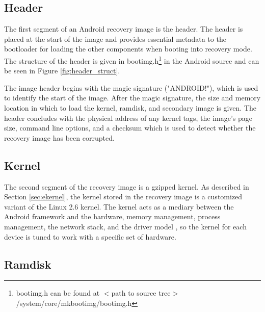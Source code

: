 \subsection{Header}
\label{sec:header}

The first segment of an Android recovery image is the header.  The header is placed at the start of the image and provides essential metadata to the bootloader for loading the other components when booting into recovery mode.  The structure of the header is given in bootimg.h\footnote{bootimg.h can be found at $<$path to source tree$>$/system/core/mkbootimg/bootimg.h} in the Android source \cite{_welcome_????} and can be seen in Figure \ref{fig:header_struct}.

The image header begins with the magic signature ("ANDROID!"), which is used to identify the start of the image.  After the magic signature, the size and memory location in which to load the kernel, ramdisk, and secondary image is given.  The header concludes with the physical address of any kernel tags, the image's page size, command line options, and a checksum which is used to detect whether the recovery image has been corrupted.

\subsection{Kernel}
\label{sec:kernel}

The second segment of the recovery image is a gzipped kernel.  As described in Section \ref{sec:ekernel}, the kernel stored in the recovery image is a customized variant of the Linux 2.6 kernel.  The kernel acts as a mediary between the Android framework and the hardware, memory management, process management, the network stack, and the driver model \cite{android_developers}, so the kernel for each device is tuned to work with a specific set of hardware.

\subsection{Ramdisk}
\label{sec:ramdisk}

